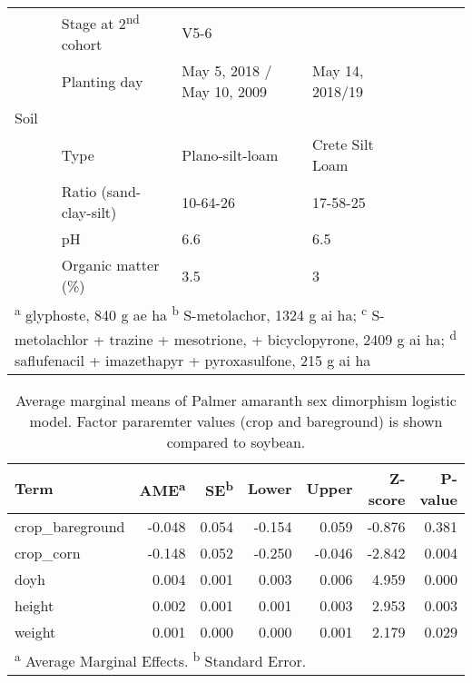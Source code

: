 \begin{table}[!h]
{\begin{tabular}[t]{lllllll}
 & Stage at 2\textsuperscript{nd} cohort & V5-6 &  &  &  & \\

\multirow{-6}{*}{\raggedright\arraybackslash } & Planting day & May 5, 2018 / May 10, 2009 & May 14, 2018/19 &  &  & \\

Soil &  &  &  &  &  & \\

 & Type & Plano-silt-loam & Crete Silt Loam &  &  & \\

 & Ratio (sand-clay-silt) & 10-64-26 & 17-58-25 &  &  & \\

 & pH & 6.6 & 6.5 &  &  & \\

\multirow{-4}{*}{\raggedright\arraybackslash } & Organic matter (\%) & 3.5 & 3 &  &  & \\
\bottomrule
\multicolumn{7}{l}{\rule{0pt}{1em}\textsuperscript{a} glyphoste, 840 g ae ha \textsuperscript{b} S-metolachor, 1324 g ai ha; \textsuperscript{c} S-metolachlor + trazine + mesotrione, + bicyclopyrone, 2409 g ai ha; \textsuperscript{d} saflufenacil + imazethapyr + pyroxasulfone, 215 g ai ha}\\
\end{tabular}}
\end{table}





\begin{table}[!h]

\caption{\label{tab:unnamed-chunk-3}Average marginal means of Palmer amaranth sex dimorphism logistic model. Factor pararemter values (crop and bareground) is shown compared to soybean.}
\centering
\fontsize{10}{12}\selectfont
\begin{tabular}[t]{lrrrrrr}
\toprule
Term & AME\textsuperscript{a} & SE\textsuperscript{b} & Lower & Upper & Z-score & P-value\\
\midrule
crop\_bareground & -0.048 & 0.054 & -0.154 & 0.059 & -0.876 & 0.381\\

crop\_corn & -0.148 & 0.052 & -0.250 & -0.046 & -2.842 & 0.004\\

doyh & 0.004 & 0.001 & 0.003 & 0.006 & 4.959 & 0.000\\

height & 0.002 & 0.001 & 0.001 & 0.003 & 2.953 & 0.003\\

weight & 0.001 & 0.000 & 0.000 & 0.001 & 2.179 & 0.029\\
\bottomrule
\multicolumn{7}{l}{\rule{0pt}{1em}\textsuperscript{a} Average Marginal Effects. \textsuperscript{b} Standard Error.}\\
\end{tabular}
\end{table}